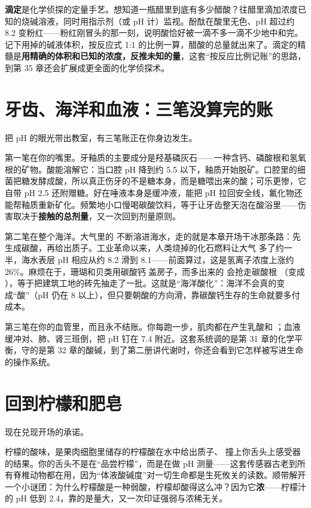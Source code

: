 \textbf{滴定}是化学侦探的定量手艺。想知道一瓶醋里到底有多少醋酸？往醋里滴加浓度已知的烧碱溶液，同时用指示剂（或 pH 计）监视。酚酞在酸里无色、pH 超过约 8.2 变粉红——粉红刚冒头的那一刻，说明酸恰好被一滴不多一滴不少地中和完。记下用掉的碱液体积，按反应式 1:1 的比例一算，醋酸的总量就出来了。滴定的精髓是\textbf{用精确的体积和已知的浓度，反推未知的量}，这套“按反应比例记账”的思路，到第 35 章还会扩展成更全面的化学侦探术。

\section{牙齿、海洋和血液：三笔没算完的账}

把 pH 的眼光带出教室，有三笔账正在你身边发生。

第一笔在你的嘴里。牙釉质的主要成分是羟基磷灰石——一种含钙、磷酸根和氢氧根的矿物。酸能溶解它：当口腔 pH 降到约 5.5 以下，釉质开始脱矿。口腔里的细菌把糖发酵成酸，所以真正伤牙的不是糖本身，而是糖喂出来的酸；可乐更惨，它自带 pH 2.5 还附赠糖。好在唾液本身是缓冲液，能把 pH 拉回安全线，氟化物还能帮釉质重新矿化。频繁地小口慢喝碳酸饮料，等于让牙齿整天泡在酸浴里——伤害取决于\textbf{接触的总剂量}，又一次回到剂量原则。

第二笔在整个海洋。大气里的  不断溶进海水，走的就是本章开场干冰那条路：先生成碳酸，再给出质子。工业革命以来，人类烧掉的化石燃料让大气  多了约一半，海水表层 pH 相应从约 8.2 滑到 8.1——前面算过，这是氢离子浓度上涨约 $26\%$。麻烦在于，珊瑚和贝类用碳酸钙  盖房子，而多出来的  会抢走碳酸根 （变成 ），等于把建筑工地的砖先抽走了一批。这就是“海洋酸化”：海洋不会真的变成“酸”（pH 仍在 8 以上），但只要朝酸的方向滑，靠碳酸钙生存的生命就要多付成本。

第三笔在你的血管里，而且永不结账。你每跑一步，肌肉都在产生乳酸和 ；血液缓冲对、肺、肾三班倒，把 pH 钉在 7.4 附近。这套系统调的是第 31 章的化学平衡，守的是第 32 章的酸碱，到了第二册讲代谢时，你还会看到它怎样被写进生命的操作系统。

\section{回到柠檬和肥皂}

现在兑现开场的承诺。

柠檬的酸味，是果肉细胞里储存的柠檬酸在水中给出质子、 撞上你舌头上感受器的结果。你的舌头不是在“品尝柠檬”，而是在做 pH 测量——这套传感器古老到所有脊椎动物都在用，因为“体液酸碱度”对一切生命都是生死攸关的读数。顺带解开一个小谜团：为什么柠檬酸是一种弱酸，柠檬却酸得这么冲？因为它\textbf{浓}——柠檬汁的 pH 低到 2.4，靠的是量大，又一次印证强弱与浓稀无关。

